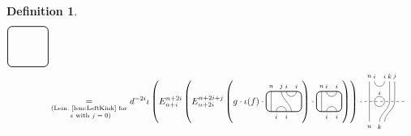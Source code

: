\documentclass[11pt]{article}
\theoremstyle{plain}
\theoremstyle{definition}
\newtheorem{defn}[thm]{Definition}
\begin{document}
\begin{defn}
\begin{align*}
\begin{tikzpicture}[baseline=.3cm]
\begin{scope}[shift={(0,-.4)}]
   \end{scope}
   \draw[thick, rounded corners=5pt] (0,-.4) rectangle (1.6,1.2);
  \end{tikzpicture}
  \\& 
  \underset{
  \substack{
  \text{(Lem.~\ref{lem:LeftKink} for}
  \\
  \text{ 
  $z$ with $j=0$)}
  }
  }
  {=}
  d^{-2i}
  \iota\left(E^{n+2i}_{n+i}\left(E^{n+2i+j}_{n+2i}\left(g\cdot\iota(f)\cdot
  \begin{tikzpicture}[baseline=.3cm]
   \draw (.2,0) -- (.2,.8);
   \node at (.2,1) {\scriptsize{$n$}};
   \draw (.6,.8) .. controls ++(-90:.3cm) and ++ (-270:.3cm) .. (1,0);
   \node at (.6,1) {\scriptsize{$j$}};
   \draw (.8,.8) arc (-180:0:.2cm);
   \node at (.8,1) {\scriptsize{$i$}};
   \node at (1.2,1) {\scriptsize{$i$}};
   \draw (.4,0) arc (180:0:.2cm);
   \node at (.4,-.2) {\scriptsize{$i$}};
   \node at (.8,-.2) {\scriptsize{$i$}};
   \draw[thick, rounded corners=5pt] (0,0) rectangle (1.4,.8);
  \end{tikzpicture}
  \right)\cdot
  \begin{tikzpicture}[baseline=.3cm]
   \draw (.2,0) -- (.2,.8);
   \node at (.2,1) {\scriptsize{$n$}};
   \draw (.4,0) arc (180:0:.2cm);
   \node at (.4,-.2) {\scriptsize{$i$}};
   \node at (.8,-.2) {\scriptsize{$i$}};
   \draw (.4,.8) arc (-180:0:.2cm);
   \node at (.4,1) {\scriptsize{$i$}};
   \node at (.8,1) {\scriptsize{$i$}};
   \draw[thick, rounded corners=5pt] (0,0) rectangle (1,.8);
  \end{tikzpicture}
  \right)\right)\cdot
  \begin{tikzpicture}[baseline=.3cm]
   \begin{scope}[shift={(0,.4)}]
    \draw (.2,0) -- (.2,.8);
    \node at (.2,1) {\scriptsize{$n$}};
    \draw (.4,0) arc (180:0:.2cm); %
    \draw (.4,.8) arc (-180:0:.2cm);
    \node at (.4,1) {\scriptsize{$i$}};
    \node at (.8,1) {\scriptsize{$i$}};
    \draw (1,0) -- (1,.8);
    \node at (1,1) {\scriptsize{$k$}};
    \draw (1.2,0) -- (1.2,.8);
    \node at (1.2,1) {\scriptsize{$j$}};
    \node at (.6,.35) {\scriptsize{$i$}};
    \draw[dashed] (0,0) -- (1.6,0);
   \end{scope}
   \begin{scope}[shift={(0,-.4)}]
    \draw (.2,0) -- (.2,.8);
    \node at (.2,-.2) {\scriptsize{$n$}};
    \draw (.4,.8) arc (-180:0:.2cm); %
    \draw (.6,0) .. controls ++(90:.3cm) and ++(270:.3cm) .. (1,.8);
    \node at (.6,-.2) {\scriptsize{$k$}};
    \draw (.8,0) .. controls ++(90:.3cm) and ++(270:.3cm) .. (1.2,.8);

\end{scope}
\end{tikzpicture}
\end{align*}
\end{defn}
\end{document}
